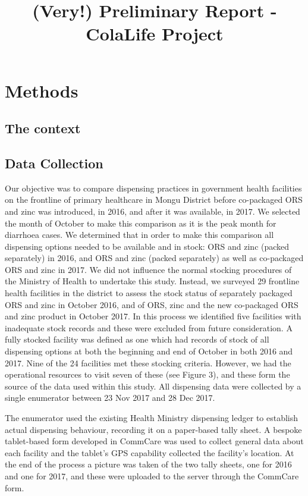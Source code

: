 \documentclass[a4paper, 12pt]{article}
\title{(Very!) Preliminary Report - ColaLife Project}
\author{}
\date{}
\begin{document}
\maketitle


\section{Methods}

\subsection{The context}

\subsection{Data Collection}
Our objective was to compare dispensing practices in government health facilities on the frontline of primary healthcare in Mongu District before co-packaged ORS and zinc was introduced, in 2016, and after it was available, in 2017. We selected the month of October to make this comparison as it is the peak month for diarrhoea cases. We determined that in order to make this comparison all dispensing options needed to be available and in stock: ORS and zinc (packed separately) in 2016, and ORS and zinc (packed separately) as well as co-packaged ORS and zinc in 2017. We did not influence the normal stocking procedures of the Ministry of Health to undertake this study. Instead, we surveyed 29 frontline health facilities in the district to assess the stock status of separately packaged ORS and zinc in October 2016, and of ORS, zinc and the new co-packaged ORS and zinc product in October 2017. In this process we identified five facilities with inadequate stock records and these were excluded from future consideration. A fully stocked facility was defined as one which had records of stock of all dispensing options at both the beginning and end of October in both 2016 and 2017. Nine of the 24 facilities met these stocking criteria. However, we had the operational resources to visit seven of these (see Figure 3), and these form the source of the data used within this study. All dispensing data were collected by a single enumerator between 23 Nov 2017 and 28 Dec 2017.

The enumerator used the existing Health Ministry dispensing ledger to establish actual dispensing behaviour, recording it on a paper-based tally sheet. A bespoke tablet-based form developed in CommCare was used to collect general data about each facility and the tablet’s GPS capability collected the facility’s location. At the end of the process a picture was taken of the two tally sheets, one for 2016 and one for 2017, and these were uploaded to the server through the CommCare form. 
\end{document}
